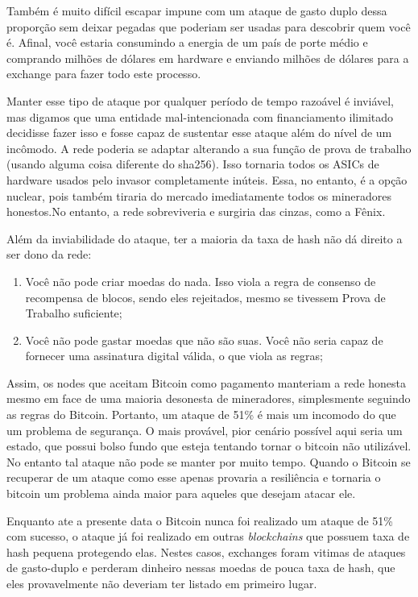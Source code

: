 Também é muito difícil escapar impune com um ataque de gasto duplo dessa proporção sem deixar pegadas que poderiam ser usadas para descobrir quem você é. 
Afinal, você estaria consumindo a energia de um país de porte médio e comprando milhões de dólares em hardware e enviando milhões de dólares para a exchange para fazer todo este processo.

Manter esse tipo de ataque por qualquer período de tempo razoável é inviável, mas digamos que uma entidade mal-intencionada com financiamento ilimitado decidisse fazer isso e fosse capaz de sustentar esse ataque além do nível de um incômodo.
A rede poderia se adaptar alterando a sua função de prova de trabalho (usando alguma coisa diferente do sha256).
Isso tornaria todos os ASICs de hardware usados pelo invasor completamente inúteis. 
Essa, no entanto, é a opção nuclear, pois também tiraria do mercado imediatamente todos os mineradores honestos.No entanto, a rede sobreviveria e surgiria das cinzas, como a Fênix.

Além da inviabilidade do ataque, ter a maioria da taxa de hash não dá direito a ser dono da rede:

\begin{enumerate}
\item Você não pode criar moedas do nada. Isso viola a regra de consenso de recompensa de blocos, sendo eles rejeitados, mesmo se tivessem Prova de Trabalho suficiente;
\item Você não pode gastar moedas que não são suas. Você não seria capaz de fornecer uma assinatura digital válida, o que viola as regras;
\end{enumerate}

Assim, os nodes que aceitam Bitcoin como pagamento manteriam a rede honesta mesmo em face de uma maioria desonesta de mineradores, simplesmente seguindo as regras do Bitcoin.
Portanto, um ataque de 51\% é mais um incomodo do que um problema de segurança.
O mais provável, pior cenário possível aqui seria um estado, que possui bolso fundo que esteja tentando tornar o bitcoin não utilizável.
No entanto tal ataque não pode se manter por muito tempo.
Quando o Bitcoin se recuperar de um ataque como esse apenas provaria a resiliência e tornaria o bitcoin um problema ainda maior para aqueles que desejam atacar ele.

Enquanto ate a presente data o Bitcoin nunca foi realizado um ataque de 51\% com sucesso, o ataque já foi realizado em outras \textit{blockchains} que possuem taxa de hash pequena protegendo elas.
Nestes casos, exchanges foram vitimas de ataques de gasto-duplo e perderam dinheiro nessas moedas de pouca taxa de hash, que eles provavelmente não deveriam ter listado em primeiro lugar.

